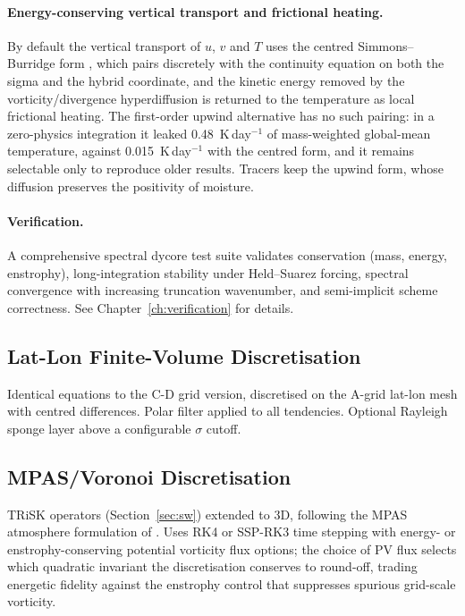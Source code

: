 \documentclass[11pt,twoside]{report}
\begin{document}
\paragraph{Energy-conserving vertical transport and frictional heating.}
By default the vertical transport of $u$, $v$ and $T$ uses the centred
Simmons--Burridge form \citep{SimmonsBurridge1981}, which pairs discretely with
the continuity equation on both the sigma and the hybrid coordinate, and the
kinetic energy removed by the vorticity/divergence hyperdiffusion is returned
to the temperature as local frictional heating.  The first-order upwind
alternative has no such pairing: in a zero-physics integration it leaked
0.48~K\,day$^{-1}$ of mass-weighted global-mean temperature, against
0.015~K\,day$^{-1}$ with the centred form, and it remains selectable only to
reproduce older results.  Tracers keep the upwind form, whose diffusion
preserves the positivity of moisture.

\paragraph{Verification.}
A comprehensive spectral dycore test suite validates conservation
(mass, energy, enstrophy), long-integration stability under
Held--Suarez forcing, spectral convergence with increasing truncation
wavenumber, and semi-implicit scheme correctness.  See
Chapter~\ref{ch:verification} for details.

\subsection{Lat-Lon Finite-Volume Discretisation}

Identical equations to the C-D grid version, discretised on the A-grid
lat-lon mesh with centred differences.  Polar filter applied to all
tendencies.  Optional Rayleigh sponge layer above a configurable
$\sigma$ cutoff.

\subsection{MPAS/Voronoi Discretisation}

TRiSK operators (Section~\ref{sec:sw}) extended to 3D, following the MPAS
atmosphere formulation of \citet{Skamarock2012}.  Uses RK4 or SSP-RK3
\citep{ShuOsher1988} time stepping with energy- or enstrophy-conserving
potential vorticity flux options; the choice of PV flux selects which
quadratic invariant the discretisation conserves to round-off, trading
energetic fidelity against the enstrophy control that suppresses spurious
grid-scale vorticity.
\end{document}
